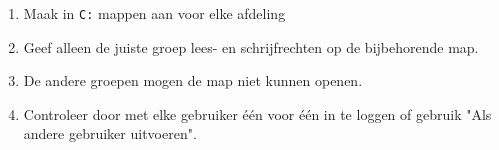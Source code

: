 \begin{enumerate}
\item Maak in \texttt{C:\Afdelingen} mappen aan voor elke afdeling
\item Geef alleen de juiste groep lees- en schrijfrechten op de bijbehorende map.
\item De andere groepen mogen de map niet kunnen openen.
\item Controleer door met elke gebruiker \'e\'en voor \'e\'en in te loggen of gebruik "Als andere gebruiker uitvoeren".
\end{enumerate}

